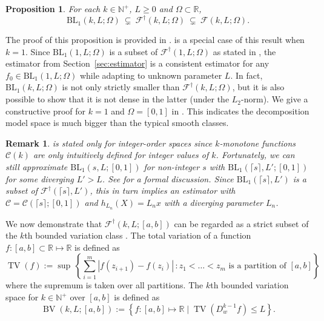 \documentclass[12pt]{article}
\newtheorem{proposition}[theorem]{Proposition}
\newtheorem{remark}{Remark}[section]
\begin{document}
\begin{proposition}
\label{prop:k-monotone-decomposition}
For each $k\in\mathbb{N}^+$, $L \geq 0$ and $\Omega \subset \mathbb{R}$,
\begin{equation*}
    \mathrm{BL}_1(k, L;\Omega) ~\subsetneq~ \mathcal{F}^\dagger(k, L;\Omega) ~\subsetneq~ \mathcal{F}(k, L;\Omega).
\end{equation*}
\end{proposition}
The proof of this proposition is provided in .  is a special case of this result when $k=1$. Since $\mathrm{BL}_1(1, L; \Omega)$ is a subset of $\mathcal{F}^\dag(1,L; \Omega)$ as stated in , the estimator from Section~\ref{sec:estimator} is a consistent estimator for any $f_0\in \mathrm{BL}_1(1, L; \Omega)$ while adapting to unknown parameter $L$. In fact, $\mathrm{BL}_1(k, L; \Omega)$ is not only strictly smaller than $\mathcal{F}^{\dagger}(k, L; \Omega)$, but it is also possible to show that it is not dense in the latter (under the $L_2$-norm). We give a constructive proof for $k=1$ and $\Omega = [0,1]$ in . This indicates the decomposition model space is much bigger than the typical smooth classes.

\begin{remark}
 is stated only for integer-order spaces since $k$-monotone functions $\mathcal{C}(k)$ are only intuitively defined for integer values of $k$. Fortunately, we can still approximate $\mathrm{BL}_1( s, L;[0,1])$ for non-integer $ s$ with $\mathrm{BL}_{1}(\lceil s\rceil, L';[0,1])$ for some diverging $L' > L$. See  for a formal discussion. Since $\mathrm{BL}_{1}(\lceil s\rceil, L')$ is a subset of $\mathcal{F}^\dagger(\lceil s\rceil, L')$, this in turn implies an estimator with $\mathcal{C} = \mathcal{C}(\lceil s\rceil; [0,1])$ and $h_{L_n}(X) = L_n x$ with a diverging parameter $L_n$.
\end{remark}

We now demonstrate that $\mathcal{F}^\dagger(k,L; [a,b])$ can be regarded as a strict subset of the $k$th bounded variation class \citep{mammen1997locally, tibshirani2014adaptive}. The total variation of a function $f:[a,b]\subset 
\mathbb{R} \mapsto \mathbb{R}$ is defined as
$$
\operatorname{TV}(f):=\sup\, \left\{\sum_{i=1}^m\left|f(z_{i+1})-f(z_i)\right|\,: z_1<\ldots<z_m \text { is a partition of }[a,b]\right\}
$$
where the supremum is taken over all partitions. The $k$th bounded variation space for $k \in \mathbb{N}^+$ over $[a,b]$ is defined as
\begin{equation*}
 \operatorname{BV}(k, L;[a,b]):=\left\{f:[a,b]\mapsto\mathbb{R}\mid  \operatorname{TV}(D^{k-1}_wf) \leq L\right\}.
\end{equation*}
\end{document}
